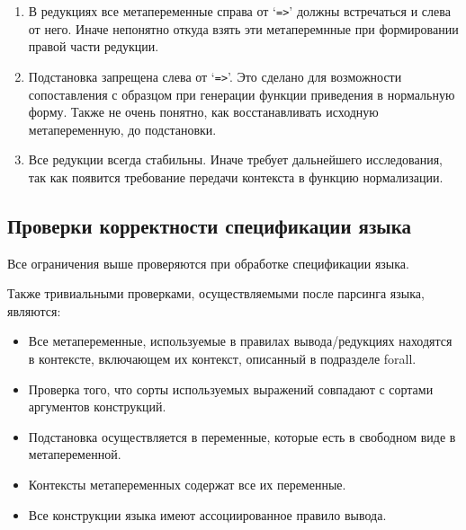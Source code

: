 \begin{enumerate}
\item В редукциях все метапеременные справа от `\lstinline{=>}' должны встречаться и слева от него. Иначе непонятно откуда взять эти метаперемнные при формировании правой части редукции.

\item Подстановка запрещена слева от `\lstinline{=>}'. Это сделано для возможности сопоставления с образцом при генерации функции приведения в нормальную форму. Также не очень понятно, как восстанавливать исходную метапеременную, до подстановки.

\item Все редукции всегда стабильны. Иначе требует дальнейшего исследования, так как появится требование передачи контекста в функцию нормализации.

\end{enumerate}

\subsection{Проверки корректности спецификации языка}

Все ограничения выше проверяются при обработке спецификации языка.

Также тривиальными проверками, осуществляемыми после парсинга языка, являются:
\begin{itemize}
\item Все метапеременные, используемые в правилах вывода/редукциях находятся в контексте, включающем их контекст, описанный в подразделе forall.
\item Проверка того, что сорты используемых выражений совпадают с сортами аргументов конструкций.
\item Подстановка осуществляется в переменные, которые есть в свободном виде в метапеременной.
\item Контексты метапеременных содержат все их переменные.
\item Все конструкции языка имеют ассоциированное правило вывода.
\end{itemize}
